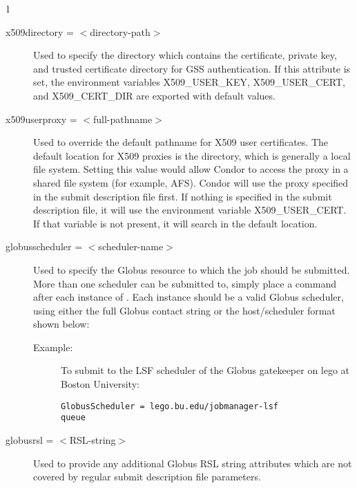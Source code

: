 \begin{ManPage}{\label{man-condor-submit}}{1}
\begin{description}

\item[x509directory = $<$directory-path$>$] Used to specify the directory 
which contains the certificate, private key, and trusted certificate directory
for GSS authentication.
If this attribute is set, the environment variables 
X509\_USER\_KEY, X509\_USER\_CERT, and X509\_CERT\_DIR are exported with 
default values.


\item[x509userproxy = $<$full-pathname$>$] Used to override the default
pathname for X509 user certificates. The default location for X509 proxies
is the  directory,
which is generally a local file system.
Setting
this value would allow Condor to access the proxy in a shared file system
(for example, AFS).
Condor will use the proxy specified in the submit description file first.
If nothing is specified in the submit description file,
it will use the environment variable X509\_USER\_CERT.
If that variable is not present,
it will search in the default location.


\item[globusscheduler = $<$scheduler-name$>$] Used to specify the 
Globus resource to which the job should be submitted. More than one scheduler
can be submitted to, simply place a  command after each instance
of .
Each instance should be a valid Globus scheduler, using
either the full Globus contact string or the host/scheduler format shown below:
\begin{description}
\item[Example:]
To submit to the LSF scheduler of the Globus gatekeeper on lego at 
Boston University:
\begin{verbatim}
GlobusScheduler = lego.bu.edu/jobmanager-lsf
queue
\end{verbatim}
\end{description}


\item[globusrsl = $<$RSL-string$>$] Used to provide any additional Globus RSL
string attributes which are not covered by regular submit description
file parameters.


\end{description}
\end{ManPage}
